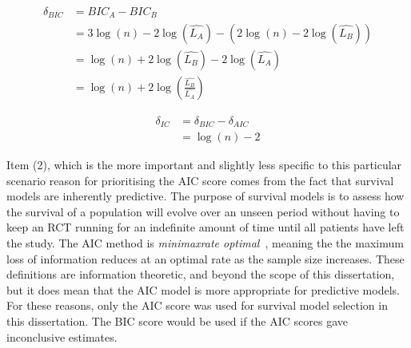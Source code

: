 \begin{align}
    \delta_{BIC} &= BIC_A - BIC_B \label{eq:bicdiff1}\\
           &= 3\log(n) - 2\log(\hat{L_A}) - (2\log(n) - 2\log(\hat{L_B})) \\
           &= \log(n) + 2\log(\hat{L_B}) - 2\log(\hat{L_A}) \\
           &= \log(n) + 2\log\left(\frac{\hat{L_B}}{\hat{L_A}}\right) \label{eq:bicdiff3}
\end{align}

\begin{align}
    \delta_{IC} &= \delta_{BIC} - \delta_{AIC} \\
                &= \log(n) - 2 \label{eq:dicDiff}
\end{align}

Item (2), which is the more important and slightly less specific to this particular scenario reason for prioritising the AIC score comes from the fact that survival models are inherently predictive. The purpose of survival models is to assess how the survival of a population will evolve over an unseen period without having to keep an RCT running for an indefinite amount of time until all patients have left the study. The AIC method is \textit{minimax\-rate optimal}~\cite{ding}, meaning the the maximum loss of information reduces at an optimal rate as the sample size increases. These definitions are information theoretic, and beyond the scope of this dissertation, but it does mean that the AIC model is more appropriate for predictive models. \\

For these reasons, only the AIC score was used for survival model selection in this dissertation. The BIC score would be used if the AIC scores gave inconclusive estimates. 